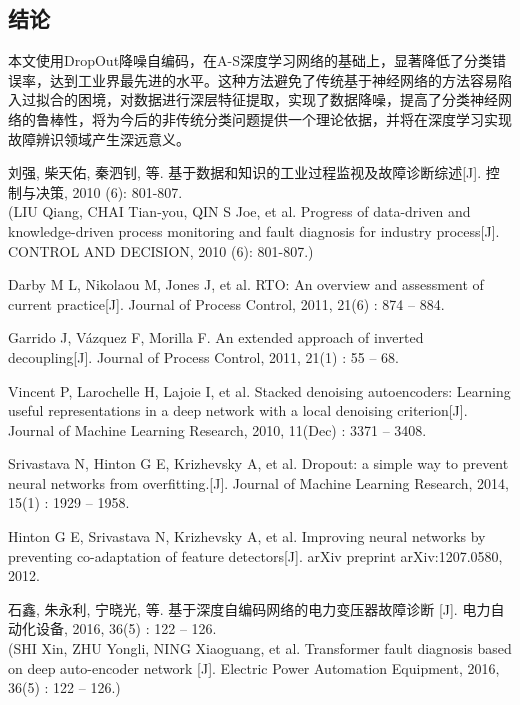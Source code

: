 \documentclass{ctacn}%
\begin{document}
\begin{multicols}{2}
\section{结\quad 论}

本文使用DropOut降噪自编码，在A-S深度学习网络的基础上，显著降低了分类错误率，达到工业界最先进的水平。这种方法避免了传统基于神经网络的方法容易陷入过拟合的困境，对数据进行深层特征提取，实现了数据降噪，提高了分类神经网络的鲁棒性，将为今后的非传统分类问题提供一个理论依据，并将在深度学习实现故障辨识领域产生深远意义。


\begin{thebibliography}{99}
\addtolength{\itemsep}{-0.7em}
% 
% 
 刘强, 柴天佑, 秦泗钊, 等. 基于数据和知识的工业过程监视及故障诊断综述[J]. 控制与决策, 2010 (6): 801-807.\\
(LIU Qiang, CHAI Tian-you, QIN S Joe, et al. Progress of data-driven and knowledge-driven process monitoring and fault diagnosis for industry process[J]. CONTROL AND DECISION, 2010 (6): 801-807.)

 Darby M L, Nikolaou M, Jones J, et al. RTO: An overview and assessment of current practice[J]. Journal of Process Control, 2011, 21(6) : 874 – 884.

 Garrido J, Vázquez F, Morilla F. An extended approach of inverted decoupling[J]. Journal of Process Control, 2011, 21(1) : 55 – 68.

 Vincent P, Larochelle H, Lajoie I, et al. Stacked denoising autoencoders: Learning useful representations in a deep network with a local denoising criterion[J]. Journal of Machine Learning Research, 2010, 11(Dec) : 3371 – 3408.

 Srivastava N, Hinton G E, Krizhevsky A, et al. Dropout: a simple way to prevent neural networks from overfitting.[J]. Journal of Machine Learning Research, 2014, 15(1) : 1929 – 1958.

 Hinton G E, Srivastava N, Krizhevsky A, et al. Improving neural networks by preventing co-adaptation of feature detectors[J]. arXiv preprint arXiv:1207.0580, 2012.

 石鑫, 朱永利, 宁晓光, 等. 基于深度自编码网络的电力变压器故障诊断 [J]. 电力自动化设备, 2016, 36(5) : 122 – 126.\\
(SHI Xin, ZHU Yongli, NING Xiaoguang, et al. Transformer fault diagnosis based on deep auto-encoder network  [J]. Electric Power Automation Equipment, 2016, 36(5) : 122 – 126.)

\end{thebibliography}\vspace{-20pt}

\end{multicols}
\end{document}
